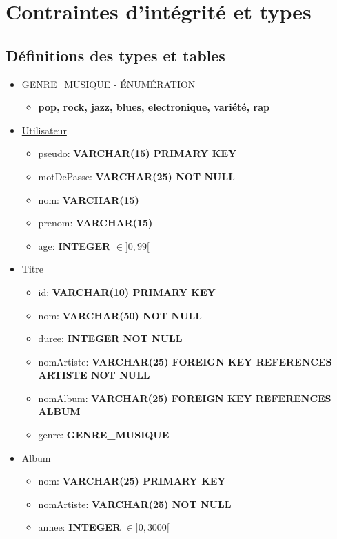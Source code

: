 \documentclass[a4paper,10pt, french]{report}
\begin{document}
\section{Contraintes d'intégrité et types}
  \subsection{Définitions des types et tables}
    \begin{itemize}
      \item \underline{GENRE\_MUSIQUE - ÉNUMÉRATION}
        \begin{itemize}
          \item \textbf{pop, rock, jazz, blues, electronique, variété, rap}
        \end{itemize}
      \item \underline{Utilisateur}
        \begin{itemize}
          \item pseudo: \textbf{VARCHAR(15) PRIMARY KEY}
          \item motDePasse: \textbf{VARCHAR(25) NOT NULL}
          \item nom: \textbf{VARCHAR(15)}
          \item prenom: \textbf{VARCHAR(15)}
          \item age: \textbf{INTEGER} $\in ]0, 99[$
        \end{itemize}
      \item Titre
        \begin{itemize}
          \item id: \textbf{VARCHAR(10) PRIMARY KEY}
          \item nom: \textbf{VARCHAR(50) NOT NULL}
          \item duree: \textbf{INTEGER NOT NULL}
          \item nomArtiste: \textbf{VARCHAR(25) FOREIGN KEY REFERENCES ARTISTE NOT NULL}
          \item nomAlbum: \textbf{VARCHAR(25) FOREIGN KEY REFERENCES ALBUM}
          \item genre: \textbf{GENRE\_MUSIQUE}
        \end{itemize}
      \item Album
        \begin{itemize}
          \item nom: \textbf{VARCHAR(25) PRIMARY KEY}
          \item nomArtiste: \textbf{VARCHAR(25) NOT NULL}
          \item annee: \textbf{INTEGER} $\in ]0, 3000[$

\end{itemize}
\end{itemize}
\end{document}
